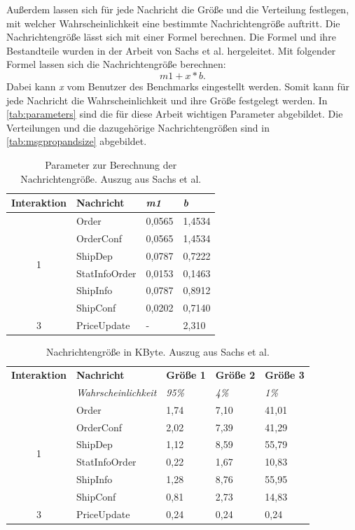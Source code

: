 Außerdem lassen sich für jede Nachricht die Größe und die Verteilung festlegen, mit welcher Wahrscheinlichkeit eine bestimmte Nachrichtengröße auftritt. Die Nachrichtengröße lässt sich mit einer Formel berechnen. Die Formel und ihre Bestandteile wurden in der Arbeit von Sachs et al.\cite{Sachs2013} hergeleitet. Mit folgender Formel lassen sich die Nachrichtengröße berechnen: 
\[m1 + x * b .\] 
Dabei kann \emph{x} vom Benutzer des Benchmarks eingestellt werden. Somit kann für jede Nachricht die Wahrscheinlichkeit und ihre Größe festgelegt werden. In \autoref{tab:parameters} sind die für diese Arbeit wichtigen Parameter abgebildet. Die Verteilungen und die dazugehörige Nachrichtengrößen sind in \autoref{tab:msgpropandsize} abgebildet.


\begin{table}
\center
  \begin{tabular}{|c|l|l|l|}
  \hline
    \textbf{Interaktion} & \textbf{Nachricht} & \textit{m1} & \textit{b}  \\
    \hline \hline
    \multirow{6}{*}{1} & Order & 0,0565 & 1,4534 \\\cline{2-4}
    & OrderConf & 0,0565 & 1,4534 \\\cline{2-4}
    & ShipDep & 0,0787 & 0,7222 \\\cline{2-4}
    & StatInfoOrder & 0,0153 & 0,1463 \\\cline{2-4}
    & ShipInfo & 0,0787 & 0,8912 \\\cline{2-4}
    & ShipConf & 0,0202 & 0,7140  \\\hline
    \hline
     3 & PriceUpdate & - & 2,310 \\\hline
  \end{tabular}
	\caption{\label{tab:parameters} Parameter zur Berechnung der Nachrichtengröße. Auszug aus Sachs et al.\cite{Sachs2013}}
\end{table}

\begin{table}
\center
  \begin{tabular}{|c|l|l|l|l|}
  \hline
    \textbf{Interaktion} & \textbf{Nachricht} & \textbf{Größe 1} & \textbf{Größe 2} &\textbf{Größe 3} \\
     & \textit{Wahrscheinlichkeit} & \textit{95\%}  & \textit{4\%} &\textit{1\%}   \\
    \hline \hline
    \multirow{6}{*}{1} & Order & 1,74 & 7,10 & 41,01 \\\cline{2-5}
    & OrderConf & 2,02 & 7,39 & 41,29 \\\cline{2-5}
    & ShipDep & 1,12 & 8,59 & 55,79\\\cline{2-5}
    & StatInfoOrder & 0,22 & 1,67 & 10,83 \\\cline{2-5}
    & ShipInfo & 1,28 & 8,76 & 55,95 \\\cline{2-5}
    & ShipConf & 0,81 & 2,73 & 14,83  \\\hline
    \hline
     3 & PriceUpdate & 0,24 & 0,24 & 0,24 \\\hline
  \end{tabular}
	\caption{\label{tab:msgpropandsize} Nachrichtengröße in KByte. Auszug aus Sachs et al.\cite{Sachs2013}}
\end{table}

